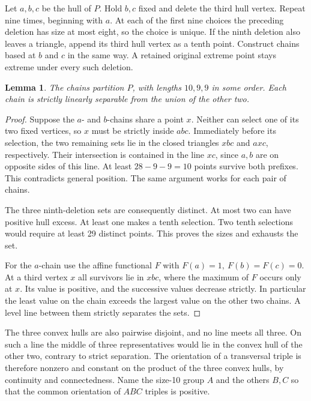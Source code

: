 \documentclass[11pt]{article}
\newtheorem{lemma}[theorem]{Lemma}
\begin{document}
Let \(a,b,c\) be the hull of \(P\). Hold \(b,c\) fixed and delete the third hull vertex. Repeat nine times, beginning with \(a\). At each of the first nine choices the preceding deletion has size at most eight, so the choice is unique. If the ninth deletion also leaves a triangle, append its third hull vertex as a tenth point. Construct chains based at \(b\) and \(c\) in the same way. A retained original extreme point stays extreme under every such deletion.

\begin{lemma}\label{lem:peel}
The chains partition \(P\), with lengths \(10,9,9\) in some order. Each chain is strictly linearly separable from the union of the other two.
\end{lemma}
\begin{proof}
Suppose the \(a\)- and \(b\)-chains share a point \(x\). Neither can select one of its two fixed vertices, so \(x\) must be strictly inside \(abc\). Immediately before its selection, the two remaining sets lie in the closed triangles \(xbc\) and \(axc\), respectively. Their intersection is contained in the line \(xc\), since \(a,b\) are on opposite sides of this line. At least \(28-9-9=10\) points survive both prefixes. This contradicts general position. The same argument works for each pair of chains.

The three ninth-deletion sets are consequently distinct. At most two can have positive hull excess. At least one makes a tenth selection. Two tenth selections would require at least 29 distinct points. This proves the sizes and exhausts the set.

For the \(a\)-chain use the affine functional \(F\) with \(F(a)=1,\ F(b)=F(c)=0\). At a third vertex \(x\) all survivors lie in \(xbc\), where the maximum of \(F\) occurs only at \(x\). Its value is positive, and the successive values decrease strictly. In particular the least value on the chain exceeds the largest value on the other two chains. A level line between them strictly separates the sets.
\end{proof}

The three convex hulls are also pairwise disjoint, and no line meets all three. On such a line the middle of three representatives would lie in the convex hull of the other two, contrary to strict separation. The orientation of a transversal triple is therefore nonzero and constant on the product of the three convex hulls, by continuity and connectedness. Name the size-10 group \(A\) and the others \(B,C\) so that the common orientation of \(ABC\) triples is positive.
\end{document}
